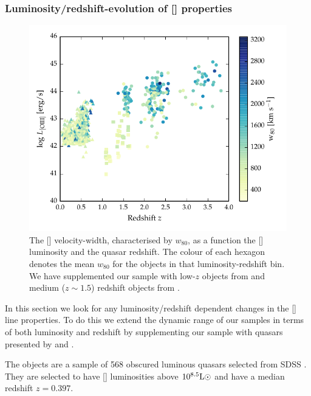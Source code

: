 \subsubsection{Luminosity/redshift-evolution of [] properties}

\begin{figure}
    \includegraphics[width=\columnwidth]{figures/chapter04/oiii_luminosity_z_w80.pdf} 
    \caption{The [] velocity-width, characterised by $w_{80}$, as a function the [] luminosity and the quasar redshift. The colour of each hexagon denotes the mean $w_{80}$ for the objects in that luminosity-redshift bin. We have supplemented our sample with low-$z$ objects from \citet{zakamska14} and medium ($z\sim1.5$) redshift objects from \citet{harrison16}. }       
    \label{fig:oiii_luminosity_z_w80}
\end{figure}

In this section we look for any luminosity/redshift dependent changes in the [] line properties. 
To do this we extend the dynamic range of our samples in terms of both luminosity and redshift by supplementing our sample with quasars presented by \citet{zakamska14} and \citet{harrison16}. 

The \citet{zakamska14} objects are a sample of 568 obscured luminous quasars selected from \ac{SDSS} \citep{reyes08,yuan16}. 
They are selected to have [] luminosities above $10^{8.5}{\rm L}\odot$ and have a median redshift $z=0.397$. 

